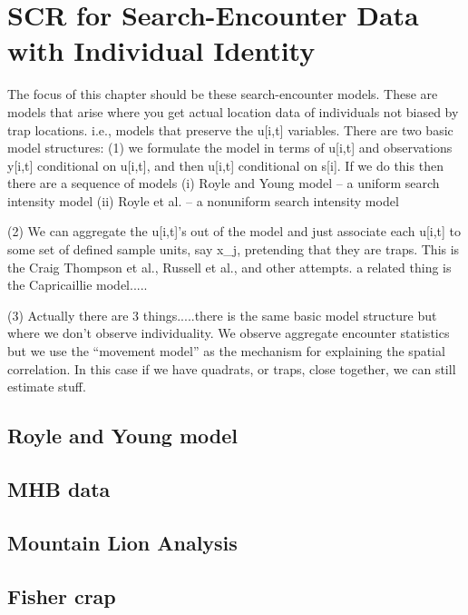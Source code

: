 \chapter{SCR for Search-Encounter Data with Individual Identity}
\label{chapt.searchencounter}

\vspace{0.3cm}


The focus of this chapter should be these search-encounter models. These are
models that arise where you get actual location data of individuals not
biased by trap locations. i.e., models that preserve the u[i,t] variables.
There are two basic model structures:
 (1) we formulate the model in terms of u[i,t] and observations y[i,t]
 conditional on u[i,t], and then u[i,t] conditional on s[i].
  If we do this then there are a sequence of models
   (i) Royle and Young model -- a uniform search intensity model
  (ii) Royle et al. -- a nonuniform search intensity model

 (2) We can aggregate the u[i,t]'s out of the model and just associate
 each u[i,t] to some set of defined sample units, say x_{j}, pretending
 that they are traps. This is the Craig Thompson et al.,  Russell et al.,
 and other attempts.  a related thing is the Capricaillie model.....

 (3) Actually there are 3 things.....there is the same basic model structure
 but where we don't observe individuality. We observe aggregate encounter
 statistics but we use the ``movement model'' as the mechanism for explaining
 the spatial correlation.  In this case if we have quadrats, or traps,
 close together, we can still estimate stuff.


\section{Royle and Young model}

\section{MHB data}

\section{Mountain Lion Analysis}

\section{Fisher crap}

